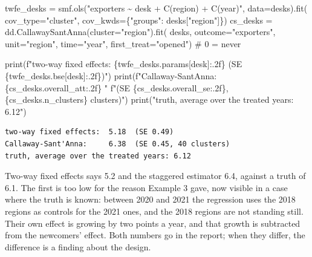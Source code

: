 \documentclass[
  letterpaper,
  10pt,
  twoside,
  openright,
  numbers=noenddot,
  chapterprefix=true]{scrbook}
\newenvironment{Shaded}{}{}
\newcommand{\BuiltInTok}[1]{\textcolor[rgb]{0.84,0.23,0.29}{#1}}
\newcommand{\CommentTok}[1]{\textcolor[rgb]{0.42,0.45,0.49}{#1}}
\newcommand{\NormalTok}[1]{\textcolor[rgb]{0.14,0.16,0.18}{#1}}
\newcommand{\OperatorTok}[1]{\textcolor[rgb]{0.14,0.16,0.18}{#1}}
\newcommand{\SpecialCharTok}[1]{\textcolor[rgb]{0.00,0.36,0.77}{#1}}
\newcommand{\SpecialStringTok}[1]{\textcolor[rgb]{0.01,0.18,0.38}{#1}}
\newcommand{\StringTok}[1]{\textcolor[rgb]{0.01,0.18,0.38}{#1}}
\begin{document}
\label{check-desks-cs}
\begin{Shaded}
\begin{Highlighting}[]
\NormalTok{twfe\_desks }\OperatorTok{=}\NormalTok{ smf.ols(}\StringTok{"exporters \textasciitilde{} desk + C(region) + C(year)"}\NormalTok{, data}\OperatorTok{=}\NormalTok{desks).fit(}
\NormalTok{    cov\_type}\OperatorTok{=}\StringTok{"cluster"}\NormalTok{, cov\_kwds}\OperatorTok{=}\NormalTok{\{}\StringTok{"groups"}\NormalTok{: desks[}\StringTok{"region"}\NormalTok{]\})}
\NormalTok{cs\_desks }\OperatorTok{=}\NormalTok{ dd.CallawaySantAnna(cluster}\OperatorTok{=}\StringTok{"region"}\NormalTok{).fit(}
\NormalTok{    desks, outcome}\OperatorTok{=}\StringTok{"exporters"}\NormalTok{, unit}\OperatorTok{=}\StringTok{"region"}\NormalTok{, time}\OperatorTok{=}\StringTok{"year"}\NormalTok{, first\_treat}\OperatorTok{=}\StringTok{"opened"}\NormalTok{)   }\CommentTok{\# 0 = never}

\BuiltInTok{print}\NormalTok{(}\SpecialStringTok{f"two{-}way fixed effects:  }\SpecialCharTok{\{}\NormalTok{twfe\_desks}\SpecialCharTok{.}\NormalTok{params[}\StringTok{\textquotesingle{}desk\textquotesingle{}}\NormalTok{]}\SpecialCharTok{:.2f\}}\SpecialStringTok{  (SE }\SpecialCharTok{\{}\NormalTok{twfe\_desks}\SpecialCharTok{.}\NormalTok{bse[}\StringTok{\textquotesingle{}desk\textquotesingle{}}\NormalTok{]}\SpecialCharTok{:.2f\}}\SpecialStringTok{)"}\NormalTok{)}
\BuiltInTok{print}\NormalTok{(}\SpecialStringTok{f"Callaway{-}Sant\textquotesingle{}Anna:     }\SpecialCharTok{\{}\NormalTok{cs\_desks}\SpecialCharTok{.}\NormalTok{overall\_att}\SpecialCharTok{:.2f\}}\SpecialStringTok{  "}
      \SpecialStringTok{f"(SE }\SpecialCharTok{\{}\NormalTok{cs\_desks}\SpecialCharTok{.}\NormalTok{overall\_se}\SpecialCharTok{:.2f\}}\SpecialStringTok{, }\SpecialCharTok{\{}\NormalTok{cs\_desks}\SpecialCharTok{.}\NormalTok{n\_clusters}\SpecialCharTok{\}}\SpecialStringTok{ clusters)"}\NormalTok{)}
\BuiltInTok{print}\NormalTok{(}\StringTok{"truth, average over the treated years: 6.12"}\NormalTok{)}
\end{Highlighting}
\end{Shaded}

\begin{verbatim}
two-way fixed effects:  5.18  (SE 0.49)
Callaway-Sant'Anna:     6.38  (SE 0.45, 40 clusters)
truth, average over the treated years: 6.12
\end{verbatim}

Two-way fixed effects says 5.2 and the staggered estimator 6.4, against
a truth of 6.1. The first is too low for the reason Example 3 gave, now
visible in a case where the truth is known: between 2020 and 2021 the
regression uses the 2018 regions as controls for the 2021 ones, and the
2018 regions are not standing still. Their own effect is growing by two
points a year, and that growth is subtracted from the newcomers' effect.
Both numbers go in the report; when they differ, the difference is a
finding about the design.
\end{document}
